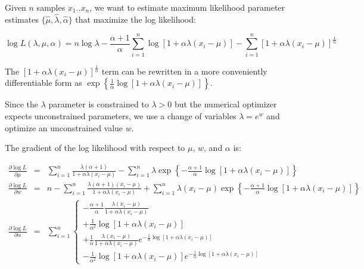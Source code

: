 Given $n$ samples $x_1..x_n$, we want to estimate maximum likelihood
parameter estimates $\{ \hat{\mu}, \hat{\lambda}, \hat{\alpha} \}$
that maximize the log likelihood:

\begin{equation}
\log L(\lambda, \mu, \alpha) = n \log \lambda 
       - \frac{\alpha+1}{\alpha} 
           \sum_{i=1}^{n} \log\left[1+ \alpha\lambda(x_i - \mu) \right]
       - \sum_{i=1}^{n} \left[ 1 + \alpha\lambda (x_i - \mu) \right]^{\frac{1}{\alpha}}
\label{eqn:gev_logL}
\end{equation}

The $\left[ 1 + \alpha\lambda (x_i - \mu) \right]^{\frac{1}{\alpha}}$
term can be rewritten in a more conveniently differentiable form as
$\exp \left\{ \frac{1}{\alpha} \log \left[ 1 + \alpha\lambda (x_i - \mu)
\right] \right\}$.

Since the $\lambda$ parameter is constrained to $\lambda > 0$ but the
numerical optimizer expects unconstrained parameters, we use a change
of variables $\lambda = e^w$ and optimize an unconstrained value $w$.

The gradient of the log likelihood with respect to $\mu$, $w$, and
$\alpha$ is:

\begin{eqnarray}
\frac{\partial \log L}{\partial \mu} & = &
  \sum_{i=1}^n \frac{\lambda (\alpha+1)}{1+\alpha\lambda(x_i-\mu)} 
 -\sum_{i=1}^n \lambda \exp 
    \left\{ -\frac{\alpha+1}{\alpha} \log
          \left[1+\alpha\lambda(x_i-\mu)\right] \right\}
\\%
\label{eqn:gev_mupartial}
\frac{\partial \log L}{\partial w} & = &
  n - \sum_{i=1}^{n} \frac{\lambda (\alpha+1) (x_i - \mu)} 
                          {1 + \alpha \lambda (x_i - \mu)}
  + \sum_{i=1}^n \lambda (x_i - \mu) 
         \exp \left\{ -\frac{\alpha+1}{\alpha} \log
          \left[1+\alpha\lambda(x_i-\mu)\right] \right\}
\\%
\label{eqn:gev_wpartial}
\frac{\partial \log L}{\partial \alpha} & = &
   \sum_{i=1}^n \left\{
      \begin{array}{l}
      - \frac{\alpha+1}{\alpha} \frac{\lambda(x_i-\mu)}
                                  {1 +\alpha\lambda(x_i-\mu)}\\
      + \frac{1}{\alpha^2} \log \left[ 1 + \alpha\lambda(x_i - \mu) \right]\\
      + \frac{1}{\alpha} \frac{\lambda(x_i-\mu)}
                          {1 +\alpha\lambda(x_i-\mu)}
      e^{-\frac{1}{\alpha} \log\left[ 1 + \alpha\lambda(x_i - \mu) \right]}\\
     -  \frac{1}{\alpha^2} \log \left[ 1 + \alpha\lambda(x_i - \mu) \right]
      e^{-\frac{1}{\alpha} \log\left[ 1 + \alpha\lambda(x_i - \mu)
	 \right]} 
     \end{array}
     \right.
\\%
\label{eqn:gev_alphapartial}
\end{eqnarray}

